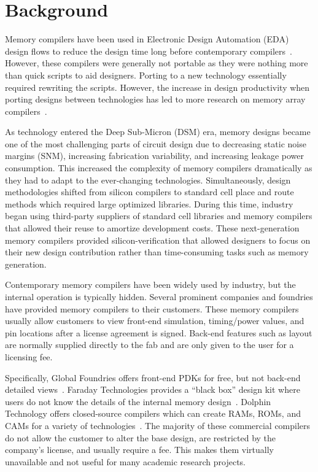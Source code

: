\section{Background}
\label{sec:background}

Memory compilers have been used in Electronic Design Automation (EDA)
design flows to reduce the design
time long before contemporary
compilers~\cite{broderson:sicompiler,johannsen:blocks}.
However, these compilers were generally not portable as they were 
nothing more
than quick scripts to aid designers. Porting to a new technology
essentially required rewriting the scripts. However, the increase in
design productivity when porting designs between technologies has led to
more research on memory array
compilers~\cite{cabe:flexible,huang:array,poechmueller:array,Xu:2007}.

As technology entered the Deep Sub-Micron (DSM) era, memory designs
became one of the most challenging parts of circuit design
due to decreasing static noise margins (SNM), increasing fabrication
variability, and increasing leakage power consumption. 
This increased the complexity of memory compilers dramatically as they had to
adapt to the ever-changing technologies. Simultaneously, design
methodologies shifted from silicon compilers to standard cell place
and route methods which required large optimized libraries. During
this time, industry began using third-party suppliers of standard cell
libraries and memory compilers that allowed their reuse to amortize
development costs. These next-generation memory compilers provided
silicon-verification that allowed designers to focus on their new
design contribution rather than time-consuming tasks such as memory
generation.

Contemporary memory compilers have been widely used by industry, but
the internal operation is typically hidden. Several prominent
companies and foundries have provided memory compilers to their
customers. These memory compilers usually allow customers to view
front-end simulation, timing/power values, and pin locations after a
license agreement is signed. Back-end features such as layout are
normally supplied directly to the fab and are only given to the user
for a licensing fee.

Specifically, Global Foundries offers front-end PDKs for free, but not
back-end detailed views~\cite{globalfoundries:2015}.  Faraday
Technologies provides a \enquote{black box} design kit where users do
not know the details of the internal memory
design~\cite{faraday:2015}. Dolphin Technology offers closed-source
compilers which can create RAMs, ROMs, and CAMs for a variety of
technologies~\cite{dolphin:2015}. The majority of these commercial
compilers do not allow the customer to alter the base design, are
restricted by the company's license, and usually require a fee. This
makes them virtually unavailable and not useful for many academic
research projects.

